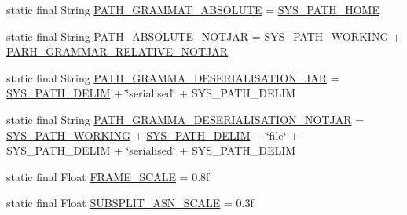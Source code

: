 \begin{DoxyCompactItemize}
\item 
static final String \hyperlink{classit_1_1emarolab_1_1cagg_1_1debugging_1_1DebuggingDefaults_acc556622b1071cf89435b9eb07d65208}{P\-A\-T\-H\-\_\-\-G\-R\-A\-M\-M\-A\-T\-\_\-\-A\-B\-S\-O\-L\-U\-T\-E} = \hyperlink{classit_1_1emarolab_1_1cagg_1_1debugging_1_1DebuggingDefaults_ae8b28f456d0e6190b071bf29fa2793d7}{S\-Y\-S\-\_\-\-P\-A\-T\-H\-\_\-\-H\-O\-M\-E}
\item 
static final String \hyperlink{classit_1_1emarolab_1_1cagg_1_1debugging_1_1DebuggingDefaults_ab6020d09c49f55a681ceb6a14c47e4d3}{P\-A\-T\-H\-\_\-\-A\-B\-S\-O\-L\-U\-T\-E\-\_\-\-N\-O\-T\-J\-A\-R} = \hyperlink{classit_1_1emarolab_1_1cagg_1_1debugging_1_1DebuggingDefaults_ac2710a46c5c4c629928170fa5e90095d}{S\-Y\-S\-\_\-\-P\-A\-T\-H\-\_\-\-W\-O\-R\-K\-I\-N\-G} + \hyperlink{classit_1_1emarolab_1_1cagg_1_1debugging_1_1DebuggingDefaults_a325c9fa4713048139bba6cf3ec933424}{P\-A\-R\-H\-\_\-\-G\-R\-A\-M\-M\-A\-R\-\_\-\-R\-E\-L\-A\-T\-I\-V\-E\-\_\-\-N\-O\-T\-J\-A\-R}
\item 
static final String \hyperlink{classit_1_1emarolab_1_1cagg_1_1debugging_1_1DebuggingDefaults_aed5333ca1da4d785b5aedf6c3c47ed05}{P\-A\-T\-H\-\_\-\-G\-R\-A\-M\-M\-A\-\_\-\-D\-E\-S\-E\-R\-I\-A\-L\-I\-S\-A\-T\-I\-O\-N\-\_\-\-J\-A\-R} = \hyperlink{classit_1_1emarolab_1_1cagg_1_1debugging_1_1DebuggingDefaults_a7c9d7fb448feba26f1848cd81cedbc3f}{S\-Y\-S\-\_\-\-P\-A\-T\-H\-\_\-\-D\-E\-L\-I\-M} + \char`\"{}serialised\char`\"{} + S\-Y\-S\-\_\-\-P\-A\-T\-H\-\_\-\-D\-E\-L\-I\-M
\item 
static final String \hyperlink{classit_1_1emarolab_1_1cagg_1_1debugging_1_1DebuggingDefaults_a8cf820f63cd9d9288cea388c2b44e585}{P\-A\-T\-H\-\_\-\-G\-R\-A\-M\-M\-A\-\_\-\-D\-E\-S\-E\-R\-I\-A\-L\-I\-S\-A\-T\-I\-O\-N\-\_\-\-N\-O\-T\-J\-A\-R} = \hyperlink{classit_1_1emarolab_1_1cagg_1_1debugging_1_1DebuggingDefaults_ac2710a46c5c4c629928170fa5e90095d}{S\-Y\-S\-\_\-\-P\-A\-T\-H\-\_\-\-W\-O\-R\-K\-I\-N\-G} + \hyperlink{classit_1_1emarolab_1_1cagg_1_1debugging_1_1DebuggingDefaults_a7c9d7fb448feba26f1848cd81cedbc3f}{S\-Y\-S\-\_\-\-P\-A\-T\-H\-\_\-\-D\-E\-L\-I\-M} + \char`\"{}file\char`\"{} + S\-Y\-S\-\_\-\-P\-A\-T\-H\-\_\-\-D\-E\-L\-I\-M + \char`\"{}serialised\char`\"{} + S\-Y\-S\-\_\-\-P\-A\-T\-H\-\_\-\-D\-E\-L\-I\-M
\item 
static final Float \hyperlink{classit_1_1emarolab_1_1cagg_1_1debugging_1_1DebuggingDefaults_ac7a249bc5d3996da2a64c5cd405cffe3}{F\-R\-A\-M\-E\-\_\-\-S\-C\-A\-L\-E} = 0.\-8f
\item 
static final Float \hyperlink{classit_1_1emarolab_1_1cagg_1_1debugging_1_1DebuggingDefaults_adf7088c65243e935301c9a31f4dfe2b4}{S\-U\-B\-S\-P\-L\-I\-T\-\_\-\-A\-S\-N\-\_\-\-S\-C\-A\-L\-E} = 0.\-3f

\end{DoxyCompactItemize}
